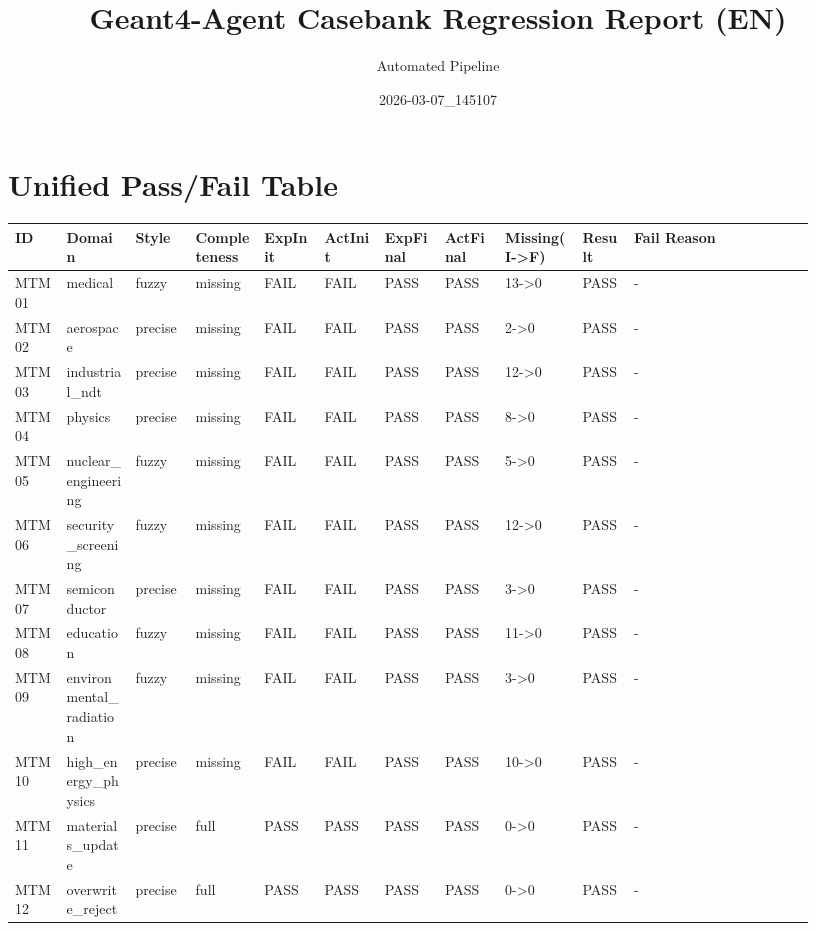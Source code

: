 \documentclass[11pt]{ctexart}
\title{Geant4-Agent Casebank Regression Report (EN)}
\author{Automated Pipeline}
\date{2026-03-07\_145107}
\begin{document}
\maketitle
\section{Unified Pass/Fail Table}
\begin{longtable}{p{0.06\linewidth}p{0.08\linewidth}p{0.07\linewidth}p{0.08\linewidth}p{0.07\linewidth}p{0.07\linewidth}p{0.07\linewidth}p{0.07\linewidth}p{0.09\linewidth}p{0.06\linewidth}p{0.21\linewidth}}
\toprule
ID & Domain & Style & Completeness & ExpInit & ActInit & ExpFinal & ActFinal & Missing(I->F) & Result & Fail Reason \\
\midrule
MTM01 & medical & fuzzy & missing & FAIL & FAIL & PASS & PASS & 13->0 & PASS & - \\
MTM02 & aerospace & precise & missing & FAIL & FAIL & PASS & PASS & 2->0 & PASS & - \\
MTM03 & industrial\_ndt & precise & missing & FAIL & FAIL & PASS & PASS & 12->0 & PASS & - \\
MTM04 & physics & precise & missing & FAIL & FAIL & PASS & PASS & 8->0 & PASS & - \\
MTM05 & nuclear\_engineering & fuzzy & missing & FAIL & FAIL & PASS & PASS & 5->0 & PASS & - \\
MTM06 & security\_screening & fuzzy & missing & FAIL & FAIL & PASS & PASS & 12->0 & PASS & - \\
MTM07 & semiconductor & precise & missing & FAIL & FAIL & PASS & PASS & 3->0 & PASS & - \\
MTM08 & education & fuzzy & missing & FAIL & FAIL & PASS & PASS & 11->0 & PASS & - \\
MTM09 & environmental\_radiation & fuzzy & missing & FAIL & FAIL & PASS & PASS & 3->0 & PASS & - \\
MTM10 & high\_energy\_physics & precise & missing & FAIL & FAIL & PASS & PASS & 10->0 & PASS & - \\
MTM11 & materials\_update & precise & full & PASS & PASS & PASS & PASS & 0->0 & PASS & - \\
MTM12 & overwrite\_reject & precise & full & PASS & PASS & PASS & PASS & 0->0 & PASS & - \\
\bottomrule
\end{longtable}
\end{document}
